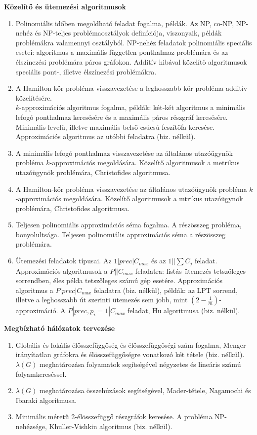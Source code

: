 \vspace{3mm}
\textbf{Közelítő és ütemezési algoritmusok}
\begin{enumerate}[resume]
\item	Polinomiális időben megoldható feladat fogalma, példák. Az NP, co-NP, NP-nehéz és NP-teljes problémaosztályok definíciója, viszonyaik, példák problémákra valamennyi osztályból. NP-nehéz feladatok polinomiális speciális esetei: algoritmus a maximális független ponthalmaz problémára és az élszínezési problémára páros gráfokon. Additív hibával közelítő algoritmusok speciális pont-, illetve élszínezési problémákra.
\item	A Hamilton-kör probléma visszavezetése a leghosszabb kör probléma additív közelítésére.\\ $k$-approximációs algoritmus fogalma, példák: két-két algoritmus a minimális lefogó ponthalmaz keresésére és a maximális páros részgráf keresésére. Minimális levelű, illetve maximális belső csúcsú feszítőfa keresése. Approximációs algoritmus az utóbbi feladatra (biz. nélkül).
\item	A minimális lefogó ponthalmaz visszavezetése az általános utazóügynök probléma $k$-approximációs megoldására. Közelítő algoritmusok a metrikus utazóügynök problémára, Christofides algoritmusa.
\item	A Hamilton-kör probléma visszavezetése az általános utazóügynök probléma $k$-approximációs megoldására. Közelítő algoritmusok a mtrikus utazóügynök problémára, Christofides algoritmusa.
\item	Teljesen polinomiális approximációs séma fogalma. A részösszeg probléma, bonyolultsága. Teljesen polinomiális approximációs séma a részösszeg problémára.
\item	Ütemezési feladatok típusai. Az $1|prec|C_{max}$ és az $1||\sum C_{j}$ feladat. Approximációs algoritmusok a $P||C_{max}$ feladatra: listás ütemezés tetszőleges sorrendben, éles példa tetszőleges számú gép esetére. Approximációs algoritmus a $P|prec|C_{max}$ feladatra (biz. nélkül), példák: az LPT sorrend, illetve a leghosszabb út szerinti ütemezés sem jobb, mint $(2-\frac {1} {m})$-approximáció. A $P|prec,p_{i}=1|C_{max}$ feladat, Hu algoritmusa (biz. nélkül).
\end{enumerate}

\vspace{3mm}
\textbf{Megbízható hálózatok tervezése}
\begin{enumerate}[resume]
\item	Globális és lokális élösszefüggőség és élösszefüggőségi szám fogalma, Menger irányítatlan gráfokra és élösszefüggőségre vonatkozó két tétele (biz. nélkül). $\lambda(G)$ meghatározása folyamatok segítségével négyzetes és lineáris számú folyamkereséssel.
\item	$\lambda(G)$ meghatározása összehúzások segítségével, Mader-tétele, Nagamochi és Ibaraki algoritmusa.
\item	Minimális méretű 2-élösszefüggő részgráfok keresése. A probléma NP-nehézsége, Khuller-Vishkin algoritmus (biz. nélkül).
\end{enumerate}

